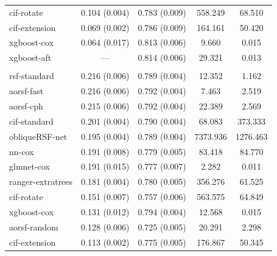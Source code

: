 \documentclass[12pt]{article}\usepackage[]{graphicx}\usepackage[]{xcolor}
\newenvironment{knitrout}{}{} %
\begin{document}
\begin{knitrout}
\begin{longtable}[t]{lcccc}
\hspace{1em}cif-rotate & 0.104 (0.004) & 0.783 (0.009) & 558.249 & 68.510\\
\hspace{1em}cif-extension & 0.069 (0.002) & 0.786 (0.009) & 164.161 & 50.420\\
\hspace{1em}xgboost-cox & 0.064 (0.017) & 0.813 (0.006) & 9.660 & 0.015\\
\hspace{1em}xgboost-aft & --- & 0.814 (0.006) & 29.321 & 0.013\\
\addlinespace[0.3em]
\multicolumn{5}{l}{\textit{\textbf{ARIC; death, n = 13623, p = 41}}}\\
\hline
\hspace{1em}rsf-standard & 0.216 (0.006) & 0.789 (0.004) & 12.352 & 1.162\\
\hspace{1em}aorsf-fast & 0.216 (0.006) & 0.792 (0.004) & 7.463 & 2.519\\
\hspace{1em}aorsf-cph & 0.215 (0.006) & 0.792 (0.004) & 22.389 & 2.569\\
\hspace{1em}cif-standard & 0.201 (0.004) & 0.790 (0.004) & 68.083 & 373.333\\
\hspace{1em}obliqueRSF-net & 0.195 (0.004) & 0.789 (0.004) & 7373.936 & 1276.463\\
\hspace{1em}nn-cox & 0.191 (0.008) & 0.779 (0.005) & 83.418 & 84.770\\
\hspace{1em}glmnet-cox & 0.191 (0.015) & 0.777 (0.007) & 2.282 & 0.011\\
\hspace{1em}ranger-extratrees & 0.181 (0.004) & 0.780 (0.005) & 356.276 & 61.525\\
\hspace{1em}cif-rotate & 0.151 (0.007) & 0.757 (0.006) & 563.575 & 64.849\\
\hspace{1em}xgboost-cox & 0.131 (0.012) & 0.794 (0.004) & 12.568 & 0.015\\
\hspace{1em}aorsf-random & 0.128 (0.006) & 0.725 (0.005) & 20.291 & 2.298\\
\hspace{1em}cif-extension & 0.113 (0.002) & 0.775 (0.005) & 176.867 & 50.345\\

\end{longtable}
\end{knitrout}
\end{document}
